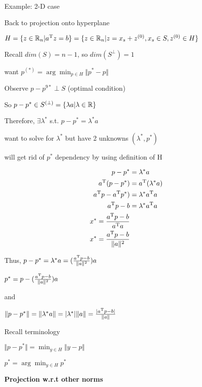 Example: 2-D case




Back to projection onto hyperplane

$H=\{z\in\mathbb{R}_{n}|a^{{\rm T}} z=b\}=\{z\in\mathbb{R}_{n}|z=x_{s}+z^{(0)},x_{s}\in S, z^{(0)}\in H\}$

Recall $dim(S)=n-1$, so $dim(S^{\perp})=1$

\begin{marginfigure}
	\centering
	\resizebox{7.5cm}{3cm}{}
	\caption{}
	\label{}
\end{marginfigure}

want $p^{(*)}=\arg \min_{p\in H} \Vert p^{*}-p\Vert$

Observe $p-p^{9*} \perp S$ (optimal condition)

So $p-p^{*} \in S^{(\perp)}=\{\lambda a|\lambda \in \mathbb{R} \}$

Therefore, $\exists \lambda^{*}$ s.t.  $p-p^{*}=\lambda^{*}a$

want to solve for $\lambda^{*}$ but have 2 unknowns $(\lambda^{*},p^{*})$

will get rid of $p^{*}$ dependency by using definition of H

\begin{align*}
p-p^{*}&=\lambda^{*}a\\
a^{{\rm T}} (p-p^{*})&=a^{{\rm T}} (\lambda^{*}a)\\
a^{{\rm T}} p-a^{{\rm T}} p^{*})&=\lambda^{*}a^{{\rm T}} a\\
a^{{\rm T}} p-b&=\lambda^{*}a^{{\rm T}} a\\
x^{*}=\frac{a^{{\rm T}} p-b}{a^{{\rm T}} a}\\
x^{*}=\frac{a^{{\rm T}} p-b}{\Vert a\Vert^{2}}\\
\end{align*}

Thus, $p-p^{*}=\lambda^{*} a=(\frac{a^{{\rm T}} p-b}{\Vert a\Vert^{2}})a$

$p^{*}=p-(\frac{a^{{\rm T}} p-b}{\Vert a\Vert^{2}})a$

and 

$\Vert p-p^{*}\Vert=\Vert \lambda^{*}a\Vert= \vert \lambda^{*}\vert \Vert a\Vert=\frac{\vert a^{{\rm T}} p-b\vert}{\Vert a\Vert}$

Recall terminology

$\Vert p-p^{*}\Vert=\min_{y\in H} \Vert y-p\Vert$

$p^{*}=\arg\min_{y\in H} p^{*}$


\vspace{0.5cm}
\noindent\textbf{Projection w.r.t other norms}

